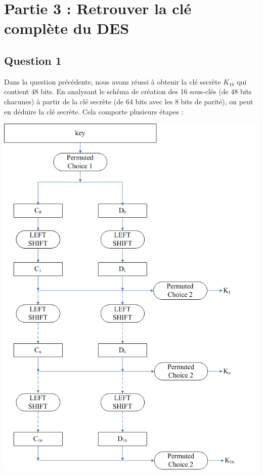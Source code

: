 \documentclass[11pt]{article}
\begin{document}
\section{Partie 3 : Retrouver la clé complète du DES}

\subsection{Question 1}

Dans la question précédente, nous avons réussi à obtenir la clé secrète $K_{16}$ qui contient 48 bits. En analysant le schéma de création des 16 sous-clés (de 48 bits chacunes) à partir de la clé secrète (de 64 bits avec les 8 bits de parité), on peut en déduire la clé secrète. Cela comporte plusieurs étapes : 

\begin{center}\includegraphics[scale=0.3]{../pictures/key_schedule.png}\end{center}
\end{document}
